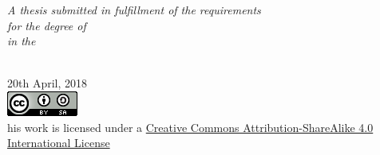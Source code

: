 \documentclass[
11pt, %
english, %
onehalfspacing, %
nolistspacing, %
headsepline, %
consistentlayout, %
]{MastersDoctoralThesis} %
\begin{document}
\begin{titlepage}
\begin{center}
\large \textit{A thesis submitted in fulfillment of the requirements\\ for the degree of \degreename}\\[0.2cm] %
\textit{in the}\\[0.2cm]
\groupname\\\deptname

{\large 20th April, 2018}\\[0.5cm] %

\includegraphics[scale=0.75]{images/cc-by-sa.png}\\
{\small his work is licensed under a 
\href{http://creativecommons.org/licenses/by-sa/4.0/}
	{Creative Commons Attribution-ShareAlike 4.0 International License}}
 
\vfill
\end{center}
\end{titlepage}

\cleardoublepage


% 
%  
%  
% 
\end{document}
